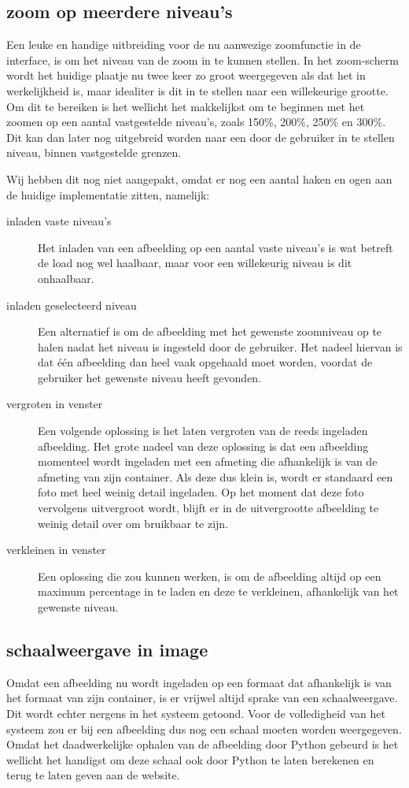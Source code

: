 \subsection{zoom op meerdere niveau's}
Een leuke en handige uitbreiding voor de nu aanwezige zoomfunctie in de interface, is om het niveau van de zoom in te kunnen stellen.
In het zoom-scherm wordt het huidige plaatje nu twee keer zo groot weergegeven als dat het in werkelijkheid is, maar idealiter is dit in te stellen naar een willekeurige grootte.
Om dit te bereiken is het wellicht het makkelijkst om te beginnen met het zoomen op een aantal vastgestelde niveau's, zoals 150\%, 200\%, 250\% en 300\%.
Dit kan dan later nog uitgebreid worden naar een door de gebruiker in te stellen niveau, binnen vastgestelde grenzen.

Wij hebben dit nog niet aangepakt, omdat er nog een aantal haken en ogen aan de huidige implementatie zitten, namelijk:
\begin{description}
	\item[inladen vaste niveau's] Het inladen van een afbeelding op een aantal vaste niveau's is wat betreft de load nog wel haalbaar, maar voor een willekeurig niveau is dit onhaalbaar.
	\item[inladen geselecteerd niveau] Een alternatief is om de afbeelding met het gewenste zoomniveau op te halen nadat het niveau is ingesteld door de gebruiker.
	Het nadeel hiervan is dat \'{e}\'{e}n afbeelding dan heel vaak opgehaald moet worden, voordat de gebruiker het gewenste niveau heeft gevonden.
	\item[vergroten in venster] Een volgende oplossing is het laten vergroten van de reeds ingeladen afbeelding.
	Het grote nadeel van deze oplossing is dat een afbeelding momenteel wordt ingeladen met een afmeting die afhankelijk is van de afmeting van zijn container.
Als deze dus klein is, wordt er standaard een foto met heel weinig detail ingeladen.
Op het moment dat deze foto vervolgens uitvergroot wordt, blijft er in de uitvergrootte afbeelding te weinig detail over om bruikbaar te zijn.
	\item[verkleinen in venster] Een oplossing die zou kunnen werken, is om de afbeelding altijd op een maximum percentage in te laden  en deze te verkleinen, afhankelijk van het gewenste niveau.
\end{description}

\subsection{schaalweergave in image}
Omdat een afbeelding nu wordt ingeladen op een formaat dat afhankelijk is van het formaat van zijn container, is er vrijwel altijd sprake van een schaalweergave.
Dit wordt echter nergens in het systeem getoond.
Voor de volledigheid van het systeem zou er  bij een afbeelding dus nog een schaal moeten worden weergegeven.
Omdat het daadwerkelijke ophalen van de afbeelding door Python gebeurd is het wellicht het handigst om deze schaal ook door Python te laten berekenen en terug te laten geven aan de website.

